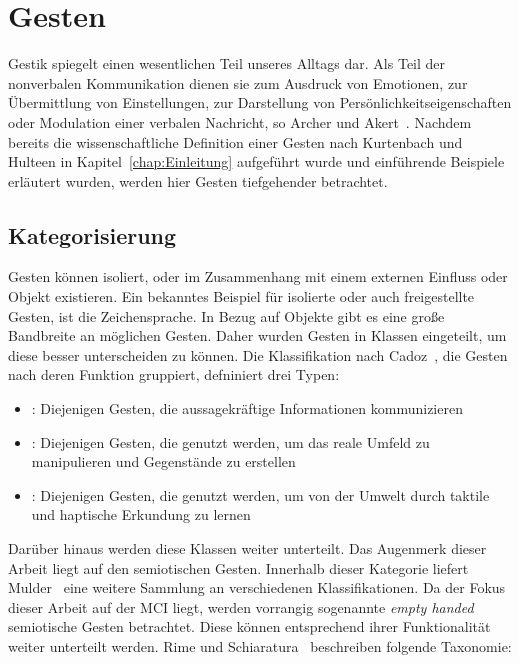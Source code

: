 \chapter{Gesten}
\label{chap:Gesten}
Gestik spiegelt einen wesentlichen Teil unseres Alltags dar. Als Teil der nonverbalen Kommunikation dienen sie zum Ausdruck von Emotionen, zur \"Ubermittlung von Einstellungen, zur Darstellung von Pers\"onlichkeitseigenschaften oder Modulation einer verbalen Nachricht, so Archer und Akert~\cite{bib:archer}. 
\newline
Nachdem bereits die wissenschaftliche Definition einer Gesten nach Kurtenbach und Hulteen in Kapitel~\ref{chap:Einleitung} aufgef\"uhrt wurde und einf\"uhrende Beispiele erl\"autert wurden, werden hier Gesten tiefgehender betrachtet.

\section{Kategorisierung}
Gesten k\"onnen isoliert, oder im Zusammenhang mit einem externen Einfluss oder Objekt existieren. Ein bekanntes Beispiel f\"ur isolierte oder auch freigestellte Gesten, ist die Zeichensprache. In Bezug auf Objekte gibt es eine gro\ss e Bandbreite an m\"oglichen Gesten.
\newline
Daher wurden Gesten in Klassen eingeteilt, um diese besser unterscheiden zu k\"onnen. Die Klassifikation nach Cadoz~\cite{bib:cadoz}, die Gesten nach deren Funktion gruppiert, defniniert drei Typen:
\begin{itemize}
\item \textit{}: Diejenigen Gesten, die aussagekr\"aftige Informationen kommunizieren
\item \textit{}: Diejenigen Gesten, die genutzt werden, um das reale Umfeld zu manipulieren und Gegenst\"ande  zu erstellen
\item \textit{}: Diejenigen Gesten, die genutzt werden, um von der Umwelt durch taktile und haptische Erkundung zu lernen
\end{itemize}
Dar\"uber hinaus werden diese Klassen weiter unterteilt. Das Augenmerk dieser Arbeit liegt auf den semiotischen Gesten. Innerhalb dieser Kategorie liefert Mulder~\cite{bib:Mulder} eine weitere Sammlung an verschiedenen Klassifikationen.
\newline
Da der Fokus dieser Arbeit auf der \gls{MCI} liegt, werden vorrangig sogenannte \textit{empty handed} semiotische Gesten betrachtet. Diese k\"onnen entsprechend ihrer Funktionalit\"at weiter unterteilt werden. Rime und Schiaratura~\cite{bib:rime} beschreiben folgende Taxonomie:
